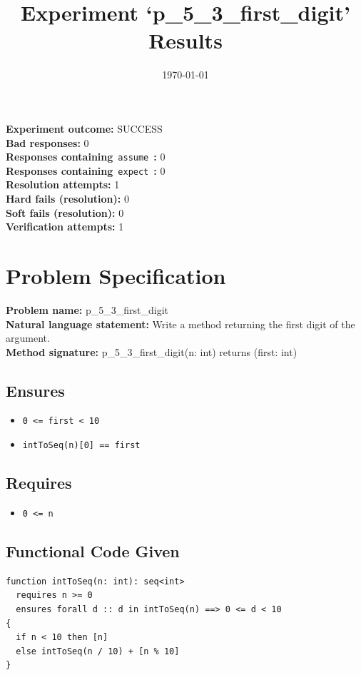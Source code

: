 \documentclass{article}
\begin{document}
\title{Experiment `p\_5\_3\_first\_digit' Results}
\author{\today}
\date{}
\maketitle
\textbf{Experiment outcome: }SUCCESS
\\\textbf{Bad responses: }0
\\\textbf{Responses containing}~\texttt{assume}~\textbf{: }0
\\\textbf{Responses containing}~\texttt{expect}~\textbf{: }0
\\\textbf{Resolution attempts: }1
\\\textbf{Hard fails (resolution): }0
\\\textbf{Soft fails (resolution): }0
\\\textbf{Verification attempts: }1
\section*{Problem Specification}
\textbf{Problem name: }p\_5\_3\_first\_digit
\\\textbf{Natural language statement: }Write a method returning the first digit of the argument.
\\\textbf{Method signature: }p\_5\_3\_first\_digit(n: int) returns (first: int)
\subsection*{Ensures}
\begin{itemize}
\item \texttt{0 <= first < 10}
\item \texttt{intToSeq(n)[0] == first}
\end{itemize}
\subsection*{Requires}
\begin{itemize}
\item \texttt{0 <= n}
\end{itemize}
\subsection*{Functional Code Given}
\begin{lstlisting}
function intToSeq(n: int): seq<int>
  requires n >= 0
  ensures forall d :: d in intToSeq(n) ==> 0 <= d < 10
{
  if n < 10 then [n]
  else intToSeq(n / 10) + [n % 10]
}
\end{lstlisting}
\clearpage
\end{document}
